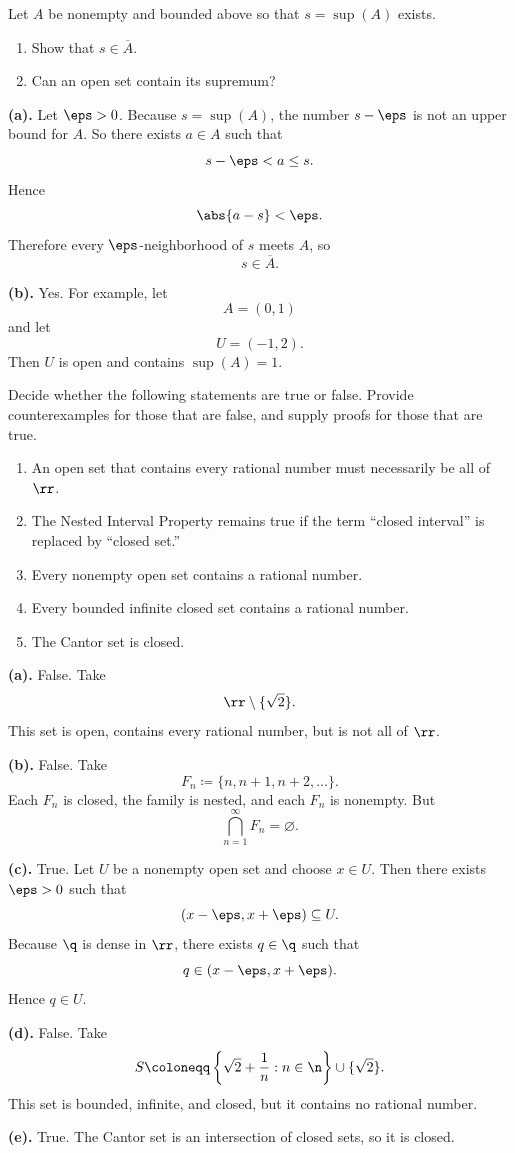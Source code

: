 \begin{problem}{
    Let $A$ be nonempty and bounded above so that $s=\sup(A)$ exists.
    \begin{enumerate}[label={(\alph*)}]
	\item Show that $s\in\overline{A}$.
    \item Can an open set contain its supremum?
    \end{enumerate}
}
    \textbf{(a).}
    Let $\eps>0$.
    Because $s=\sup(A)$, the number $s-\eps$ is not an upper bound for $A$.
    So there exists $a\in A$ such that
    \[
        s-\eps<a\leq s.
    \]
    Hence
    \[
        \abs{a-s}<\eps.
    \]
    Therefore every $\eps$-neighborhood of $s$ meets $A$, so
    \[
        s\in\overline{A}.
    \]

    \textbf{(b).}
    Yes.
    For example, let
    \[
        A=(0,1)
    \]
    and let
    \[
        U=(-1,2).
    \]
    Then $U$ is open and contains $\sup(A)=1$.
\end{problem}

\begin{problem}{
    Decide whether the following statements are true or false.
    Provide counterexamples for those that are false, and supply proofs for those that are true.
    \begin{enumerate}[label={(\alph*)}]
	\item An open set that contains every rational number must necessarily be all of $\rr$.
    \item The Nested Interval Property remains true if the term “closed interval” is replaced by “closed set.”
    \item Every nonempty open set contains a rational number.
    \item Every bounded infinite closed set contains a rational number.
    \item The Cantor set is closed.
    \end{enumerate}
}
    \textbf{(a).} False.
    Take
    \[
        \rr\setminus\{\sqrt{2}\}.
    \]
    This set is open, contains every rational number, but is not all of $\rr$.

    \textbf{(b).} False.
    Take
    \[
        F_n \coloneqq \{n,n+1,n+2,\ldots\}.
    \]
    Each $F_n$ is closed, the family is nested, and each $F_n$ is nonempty.
    But
    \[
        \bigcap_{n=1}^\infty F_n = \varnothing.
    \]

    \textbf{(c).} True.
    Let $U$ be a nonempty open set and choose $x\in U$.
    Then there exists $\eps>0$ such that
    \[
        (x-\eps,x+\eps)\subseteq U.
    \]
    Because $\q$ is dense in $\rr$, there exists $q\in\q$ such that
    \[
        q\in(x-\eps,x+\eps).
    \]
    Hence $q\in U$.

    \textbf{(d).} False.
    Take
    \[
        S\coloneqq \left\{\sqrt{2}+\frac1n : n\in\n\right\}\cup\{\sqrt{2}\}.
    \]
    This set is bounded, infinite, and closed, but it contains no rational number.

    \textbf{(e).} True.
    The Cantor set is an intersection of closed sets, so it is closed.
\end{problem}

